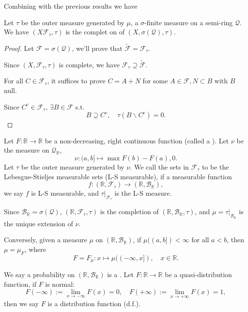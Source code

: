 Combining with the previous results we have
\begin{theorem}
    Let $\tau$ be the outer measure generated by $\mu$,
	a $\sigma$-finite measure on a semi-ring $ \mathscr{Q}$.
	We have $(X \mathscr{F}_\tau,\tau)$ is
	the complet on of $(X,\sigma(\mathscr{Q}), \tau)$.
\end{theorem}
\begin{proof}[Proof]
    Let $\mathscr{F} = \sigma(\mathscr{Q})$, we'll prove that
	$\widetilde{\mathscr{F}} = \mathscr{F}_\tau$.

	Since $(X,\mathscr{F}_\tau,\tau)$ is complete, we have $\mathscr{F}_\tau
	\supseteq \widetilde{\mathscr{F}}$.

	For all $C\in \mathscr{F}_\tau$, it suffices to prove $C = A+N$ for some
	$A\in \mathscr{F}, N \subset B$ with $B$ null.

	Since $C^c\in \mathscr{F}_\tau$, $\exists B\in \mathscr{F}$ s.t.
	\[
	B\supseteq C^c,\quad \tau(B\backslash C^c) = 0.
	\]
	
\end{proof}
\begin{example}
    Let $F: \mathbb{R}\to \mathbb{R}$ be a non-decreasing, right continuous
	function (called a ).
	Let $\nu$ be the measure on $\mathscr{Q}_{\mathbb{R}}$,
	\[
		\nu : (a,b] \mapsto \max{F(b)-F(a), 0}.
	\]
	Let $\tau$ be the outer measure generated by $\nu$. 
	We call the sets in $\mathscr{F}_\tau$ to be the Lebesgue-Stieljes
	measurable sets (L-S measurable), if a measurable function
	 \[
	f: (\mathbb{R}, \mathscr{F}_\tau)\to (\mathbb{R}, \mathscr{B}_{\mathbb{R}}),
	\]
	we say $f$ is L-S measurable, and  $\tau\big|_{\mathscr{F}_\tau}$ is the L-S
	measure.

	Since $\mathscr{B}_{\mathbb{R}}=\sigma(\mathscr{Q})$,
	$(\mathbb{R},\mathscr{F}_\tau,\tau)$ is the completion of
	$(\mathbb{R}, \mathscr{B}_{\mathbb{R}},\tau)$,
	and $\mu = \tau\big|_{\mathscr{B}_{\mathbb{R}}}$ is the unique extension of $\nu$. 

	Conversely, given a measure $\mu$ on  $(\mathbb{R}, \mathscr{B}_{\mathbb{R}})$,
	if $\mu((a,b])<\infty$ for all $a<b$, then  $\mu=\mu_F$, where
	 \[
		 F = F_\mu : x \mapsto \mu((-\infty,x]), \quad x\in \mathbb{R}.
	\]
\end{example}

We say a probability on $(\mathbb{R}, \mathscr{B}_{\mathbb{R}})$ is
a .
Let $F: \mathbb{R}\to \mathbb{R}$ be a quasi-distribution function,
if $F$ is normal:
 \[
F(-\infty) := \lim_{x\to -\infty}F(x) = 0,\quad
F(+\infty):=\lim_{x\to +\infty}F(x) = 1,
\]
then we say $F$ is a distribution function (d.f.).

